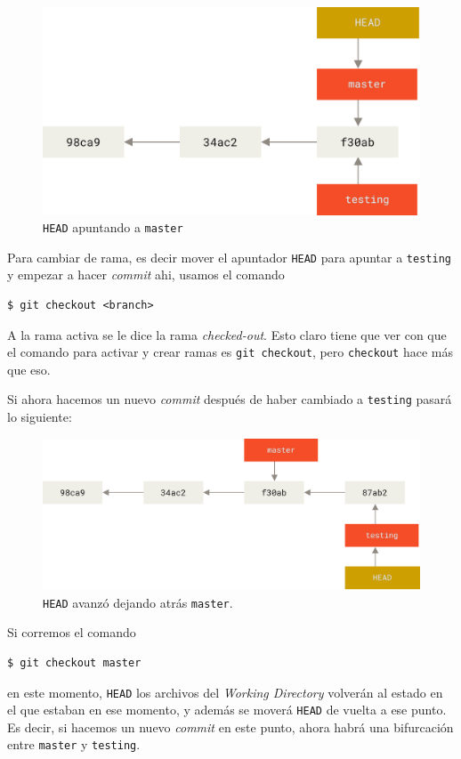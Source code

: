 \documentclass[spanish, 12pt, a4paper]{article}
\begin{document}
\begin{figure}[h]
  \centering
  \includegraphics[width=\textwidth]{figs/head-to-master.png}
  \caption{\texttt{HEAD} apuntando a \texttt{master}}
\end{figure}

Para cambiar de rama, es decir mover el apuntador \texttt{HEAD} para apuntar a \texttt{testing} y empezar a hacer \textit{commit} ahi, usamos el comando
\begin{lstlisting}
$ git checkout <branch>
\end{lstlisting}

A la rama activa se le dice la rama \textit{checked-out}.
Esto claro tiene que ver con que el comando para activar y crear ramas es \texttt{git checkout}, pero \texttt{checkout} hace más que eso.

Si ahora hacemos un nuevo \textit{commit} después de haber cambiado a \texttt{testing} pasará lo siguiente: 

\begin{figure}[h]
  \centering
  \includegraphics[width=\textwidth]{figs/advance-testing.png}
  \caption{\texttt{HEAD} avanzó dejando atrás \texttt{master}.}
\end{figure}

Si corremos el comando
\begin{lstlisting}
$ git checkout master
\end{lstlisting}
en este momento, \texttt{HEAD} los archivos del \textit{Working Directory} volverán al estado en el que estaban en ese momento, y además se moverá \texttt{HEAD} de vuelta a ese punto.
Es decir, si hacemos un nuevo \textit{commit} en este punto, ahora habrá una bifurcación entre \texttt{master} y \texttt{testing}.
\end{document}

